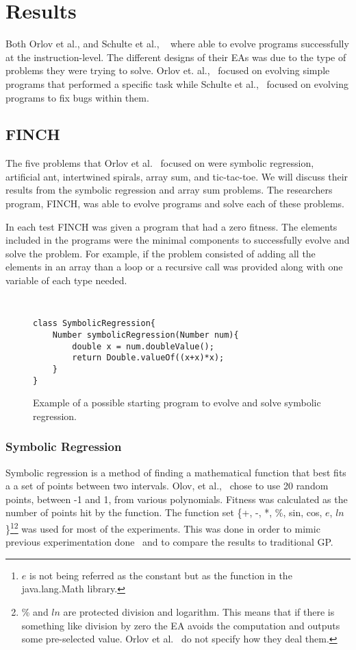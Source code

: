 \documentclass{sig-alternate}
\begin{document}
\section{Results}
Both Orlov et al., and Schulte et al., ~\cite{FINCH:2011, Assembly:2010} where able to evolve programs successfully at the instruction-level. The different designs of their EAs was due to the type of problems they were trying to solve. Orlov et. al.,~\cite{FINCH:2011} focused on evolving simple programs that performed a specific task while Schulte et al.,~\cite{Assembly:2010} focused on evolving programs to fix bugs within them.

\subsection{FINCH}
The five problems that Orlov et al.~\cite{Assembly:2010} focused on were symbolic regression, artificial ant, intertwined spirals, array sum, and tic-tac-toe. We will discuss their results from the symbolic regression and array sum problems. The researchers program, FINCH, was able to evolve programs and solve each of these problems.

In each test FINCH was given a program that had a zero fitness. The elements included in the programs were the minimal components to successfully evolve and solve the problem. For example, if the problem consisted of adding all the elements in an array than a loop or a recursive call was provided along with one variable of each type needed.

\begin{figure}
\centering
{\tt
\begin{verbatim}
class SymbolicRegression{
    Number symbolicRegression(Number num){
        double x = num.doubleValue();
        return Double.valueOf((x+x)*x);
    }
}
\end{verbatim}
}
\caption{Example of a possible starting program to evolve and solve symbolic regression.}
\label{regression}
\end{figure}
\subsubsection{Symbolic Regression}
Symbolic regression is a method of finding a mathematical function that best fits a a set of points between two intervals. Olov, et al.,~\cite{FINCH:2011} chose to use 20 random points, between -1 and 1, from various polynomials. Fitness was calculated as the number of points hit by the function. The function set \{+, -, *, \%, sin, cos, $e$, $ln$\}\footnote{$e$ is not being referred as the constant but as the function in the java.lang.Math library.}\footnote{\% and $ln$ are protected division and logarithm. This means that if there is something like division by zero the EA avoids the computation and outputs some pre-selected value. Orlov et al.~\cite{FINCH:2011} do not specify how they deal them.} was used for most of the experiments. This was done in order to mimic previous experimentation done~\cite{koza:1992} and to compare the results to traditional GP.
\end{document}
